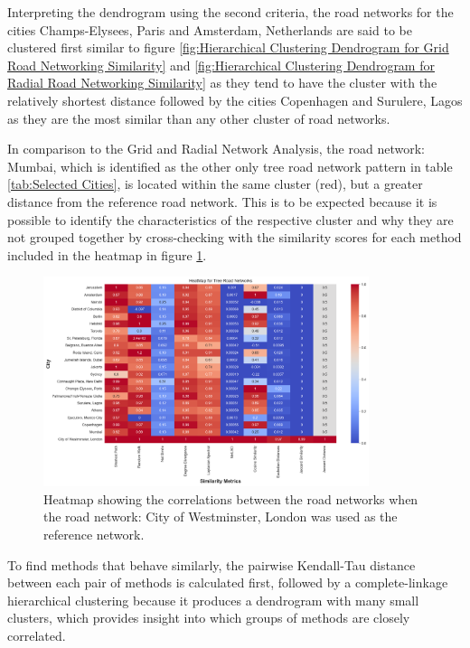 Interpreting the dendrogram using the second criteria, the road networks for the cities Champs-Elysees, Paris and Amsterdam, Netherlands are said to be clustered first similar to figure \ref{fig:Hierarchical Clustering Dendrogram for Grid Road Networking Similarity} and \ref{fig:Hierarchical Clustering Dendrogram for Radial Road Networking Similarity} as they tend to have the cluster with the relatively shortest distance followed by the cities Copenhagen and Surulere, Lagos as they are the most similar than any other cluster of road networks.

In comparison to the Grid and Radial Network Analysis, the road network: Mumbai, which is identified as the other only tree road network pattern in table \ref{tab:Selected Cities}, is located within the same cluster (red), but a greater distance from the reference road network. This is to be expected because it is possible to identify the characteristics of the respective cluster and why they are not grouped together by cross-checking with the similarity scores for each method included in the heatmap in figure \ref{fig:Heatmap showing the correlations for Tree Road Networks}.


\begin{figure}[!ht]
\centering
\includegraphics[width=0.85\textwidth,center]{picture/Tree/treeheatmap.png}
\caption[Heatmap showing the correlations for Tree Road Networks]{Heatmap showing the correlations between the road networks when the road network: City of Westminster, London was used as the reference network.}
\label{fig:Heatmap showing the correlations for Tree Road Networks}
\end{figure}

To find methods that behave similarly, the pairwise Kendall-Tau distance between each pair of methods is calculated first, followed by a complete-linkage hierarchical clustering because it produces a dendrogram with many small clusters, which provides insight into which groups of methods are closely correlated.

